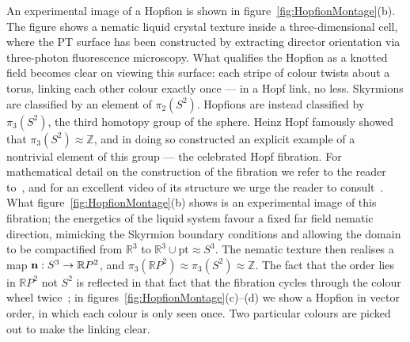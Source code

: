 An experimental image of a Hopfion is shown in figure~\ref{fig:HopfionMontage}(b)\citep{ChenThesis,Chen2013}. The figure shows a nematic liquid crystal texture inside a three-dimensional cell, where the PT surface has been constructed by extracting director orientation via three-photon fluorescence microscopy. What qualifies the Hopfion as a knotted field becomes clear on viewing this surface: each stripe of colour twists about a torus, linking each other colour exactly once --- in a Hopf link, no less. Skyrmions are classified by an element of $\pi_2(S^2)$. Hopfions are instead classified by $\pi_3(S^2)$, the third homotopy group of the sphere. Heinz Hopf famously showed that $\pi_3(S^2) \approx \mathbb{Z}$, and in doing so constructed an explicit example of a nontrivial element of this group --- the celebrated Hopf fibration. For mathematical detail on the construction of the fibration we refer to the reader to~\citep{BottTuBook,AlexanderBook}, and for an excellent video of its structure we urge the reader to consult~\citep{Johnson2011}. What figure~\ref{fig:HopfionMontage}(b) shows is an experimental image of this fibration; the energetics of the liquid system favour a fixed far field nematic direction, mimicking the Skyrmion boundary conditions and allowing the domain to be compactified  from $\mathbb{R}^3$ to $\mathbb{R}^3 \cup \textrm{pt} \approx {S}^3$. The nematic texture then realises a map ${\bf n}: S^3 \rightarrow \mathbb{R}P^2$, and $\pi_3(\mathbb{R}P^2) \approx \pi_3(S^2) \approx \mathbb{Z}$. The fact that the order lies in $\mathbb{R}P^2$ not $S^2$ is reflected in that fact that the fibration cycles through the colour wheel twice~\citep{Chen2013,Ackerman2017}; in figures~\ref{fig:HopfionMontage}(c)--(d) we show a Hopfion in vector order, in which each colour is only seen once. Two particular colours are picked out to make the linking clear.
